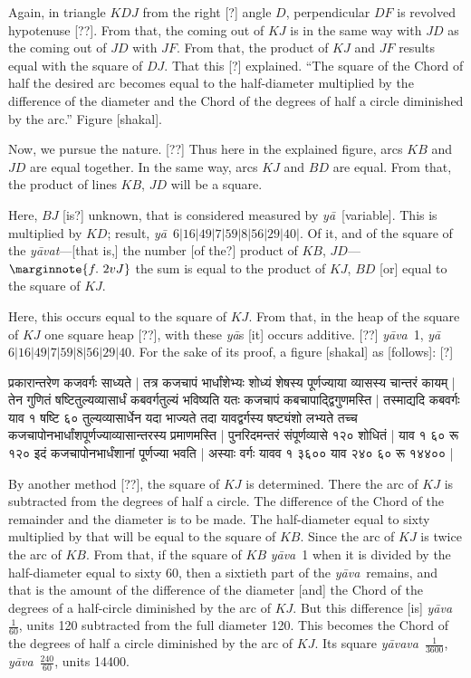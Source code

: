 \documentclass[12pt]{book}
\def\ya{\textit{y\=a}}
\def\yava{\textit{y\=ava}}
\def\yavava{\textit{y\=avava}}
\begin{document}
\newpage

Again, in triangle $KDJ$ from the right [?] angle $D$, perpendicular $DF$ 
is revolved hypotenuse [??].  From that, the coming out of $KJ$ is in the same
way with $JD$ as the coming out of $JD$ with $JF$. 
From that, the product of $KJ$ and $JF$ results equal with the square of 
$DJ$. That this [?] explained. ``The square of the Chord of half the desired arc
becomes equal to the half-diameter multiplied by the difference of the 
diameter and the Chord of the degrees of half a circle diminished by the arc.''
Figure [shakal]. 

Now, we pursue the nature.  [??] Thus here in the explained figure, arcs
$KB$ and $JD$ are equal together. In the same way, arcs $KJ$ and  $BD$ 
are equal.  From that, the product of lines $KB$, $JD$ will be a square.

Here, $BJ$ [is?] unknown, that is considered measured by \ya\ [variable]. 
This is multiplied by $KD$; result, \ya\ $6|16|49|7|59|8|56|29|40|$. 
Of it, and of the square of the \textit{y\=avat}---[that is,] 
the number [of the?] product of $KB$, $JD$---
$\marginnote{f.~2v J}$ 
the sum is equal to the product of $KJ$, $BD$ [or] equal to the square of $KJ$.

Here, this occurs equal to the square of $KJ$. From that, in the heap of the
square of $KJ$ one square heap [??], with these \ya s [it] occurs additive. [??]
\yava\ 1, \ya\ $6|16|49|7|59|8|56|29|40$. For the sake of its proof, a figure
[shakal] as [follows]: [?] 

\newpage

{\s प्रकारान्तरेण कजवर्गः साध्यते | तत्र कजचापं
भार्धांशेभ्यः शोध्यं शेषस्य पूर्णज्याया व्यासस्य चान्तरं कायम् |
तेन
गुणितं षष्टितुल्यव्यासार्धं कबवर्गतुल्यं भविष्यति
यतः कजचापं
कबचापाद्द्विगुणमस्ति |
तस्माद्यदि कबवर्गः याव १ षष्टि ६० तुल्यव्यासार्धेन यदा
भाज्यते तदा यावद्वर्गस्य षष्ट्यंशो लभ्यते तच्च
कजचापोनभार्धांशपूर्णज्याव्यासान्तरस्य प्रमाणमस्ति | पुनरिदमन्तरं
संपूर्णव्यासे १२० शोधितं | याव १ ६० रू १२० इदं
कजचापोनभार्धंशानां पूर्णज्या भवति |
अस्याः वर्गः यावव १ ३६०० याव
२४० ६० रू १४४०० |}

\newpage

By another method [??], the square of $KJ$ is determined.  There the arc of $KJ$ 
is subtracted from the degrees of half a circle. The difference of the Chord of the
remainder and the diameter is to be made. The half-diameter equal to sixty 
multiplied by that will be equal to the square of $KB$. Since the arc of $KJ$
is twice the arc of $KB$.  From that, if the square of $KB$ \yava\ 1 when it is
divided by the half-diameter equal to sixty 60, then a sixtieth part of the 
\yava\ remains, and that is the amount of the difference
of the diameter [and] the Chord of the degrees of a half-circle
diminished by the arc of $KJ$.  But this difference [is] \yava\ $\frac{1}{60}$, units 120
subtracted from the 
full diameter 120. This becomes the 
Chord of the degrees of half a circle diminished by the arc of $KJ$. 
Its square \yavava\ $\frac{1}{3600}$, \yava\ $\frac{240}{60}$, units 14400. 
\end{document}
